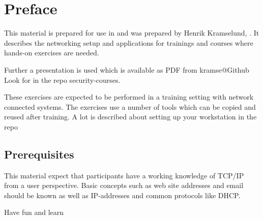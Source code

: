 \documentclass[a4paper,11pt,notitlepage]{report}
\begin{document}
\rm
{}

\newcommand{\kursus}[1]{Security in Web Development elective course}
\newcommand{\kursusnavn}[1]{Security in Web Development elective\\ exercises}


\setcounter{tocdepth}{0}

\normal

{\color{titlecolor}\tableofcontents}

\normal
\pagestyle{fancyplain}
\chapter*{\color{titlecolor}Preface}

This material is prepared for use in \emph{\kursus} and was prepared by
Henrik Kramselund,  .
It describes the networking setup and
applications for trainings and courses where hands-on exercises are needed.

Further a presentation is used which is available as PDF from kramse@Github\\
Look for \jobname in the repo security-courses.

These exercises are expected to be performed in a training setting with network connected systems. The exercises use a number of tools which can be copied and reused after training. A lot is described about setting up your workstation in the repo



\section*{\color{titlecolor}Prerequisites}

This material expect that participants have a working knowledge of
TCP/IP from a user perspective. Basic concepts such as web site addresses and email should be known as well as IP-addresses and common protocols like DHCP.

\vskip 1cm
Have fun and learn
\eject

\rhead{\fancyplain{}{\bf \chaptername\ \thechapter}}

\end{document}
